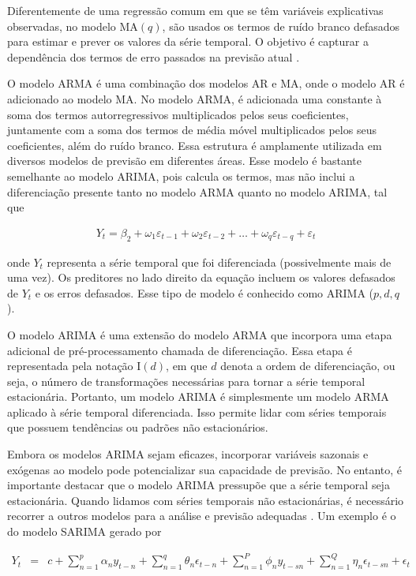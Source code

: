 Diferentemente de uma regressão comum em que se têm variáveis explicativas observadas, no modelo MA$(q)$, são usados os termos de ruído branco defasados para estimar e prever os valores da série temporal. O objetivo é capturar a dependência dos termos de erro passados na previsão atual \cite{arima}.
 
O modelo ARMA é uma combinação dos modelos AR  e MA, onde o modelo AR é adicionado ao modelo MA. No modelo ARMA, é adicionada uma constante à soma dos termos autorregressivos multiplicados pelos seus coeficientes, juntamente com a soma dos termos de média móvel multiplicados pelos seus coeficientes, além do ruído branco. Essa estrutura é amplamente utilizada em diversos modelos de previsão em diferentes áreas. Esse modelo é bastante semelhante ao modelo ARIMA, pois calcula os termos, mas não inclui a diferenciação presente tanto no modelo ARMA quanto no modelo ARIMA, tal que
 
 \begin{eqnarray}
 	Y_t = \beta_2 + \omega_1\varepsilon_{t-1} + \omega_2 \varepsilon_{t-2} +\ldots+ \omega_q \varepsilon_{t-q} + \varepsilon_t \label{arima}
 \end{eqnarray}
 
 \noindent onde $Y_t$ representa a série temporal que foi diferenciada (possivelmente mais de uma vez). Os preditores no lado direito da equação incluem os valores defasados de $Y_t$ e os erros defasados. Esse tipo de modelo é conhecido como ARIMA ($p, d, q$).
 
 O modelo ARIMA é uma extensão do modelo ARMA que incorpora uma etapa adicional de pré-processamento chamada de diferenciação. Essa etapa é representada pela notação I$(d)$, em que $d$ denota a ordem de diferenciação, ou seja, o número de transformações necessárias para tornar a série temporal estacionária. Portanto, um modelo ARIMA é simplesmente um modelo ARMA aplicado à série temporal diferenciada. Isso permite lidar com séries temporais que possuem tendências ou padrões não estacionários.
 
 Embora os modelos ARIMA sejam eficazes, incorporar variáveis sazonais e exógenas ao modelo pode potencializar sua capacidade de previsão. No entanto, é importante destacar que o modelo ARIMA pressupõe que a série temporal seja estacionária. Quando lidamos com séries temporais não estacionárias, é necessário recorrer a outros modelos para a análise e previsão adequadas  \cite{arima}. Um exemplo é o do modelo SARIMA gerado por
 
 \begin{eqnarray}
 	Y_t&=&c+\sum_{n=1}^p \alpha_n y_{t-n}+\sum_{n=1}^q \theta_n \epsilon_{t-n}+\sum_{n=1}^P \phi_n y_{t-s n}+\sum_{n=1}^Q \eta_n \epsilon_{t-s n}+\epsilon_t \label{sarima}
 \end{eqnarray}
 
